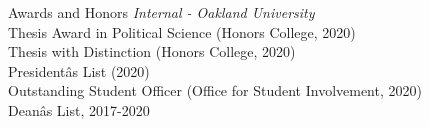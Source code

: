 \documentclass{resume} %
\begin{document}
\begin{rSection}{Awards and Honors}
{\it Internal - Oakland University}
\\Thesis Award in Political Science (Honors College, 2020)
\\Thesis with Distinction (Honors College, 2020)
\\Presidentâs List (2020)
\\Outstanding Student Officer (Office for Student Involvement, 2020)
\\Deanâs List, 2017-2020 

\end{rSection}








    
\end{document}

